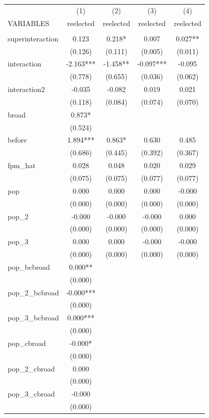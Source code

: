 \documentclass[]{article}
\begin{document}
\begin{tabular}{lcccc} \hline
 & (1) & (2) & (3) & (4) \\
VARIABLES & reelected & reelected & reelected & reelected \\ \hline
 &  &  &  &  \\
superinteraction & 0.123 & 0.218* & 0.007 & 0.027** \\
 & (0.126) & (0.111) & (0.005) & (0.011) \\
interaction & -2.163*** & -1.458** & -0.097*** & -0.095 \\
 & (0.778) & (0.655) & (0.036) & (0.062) \\
interaction2 & -0.035 & -0.082 & 0.019 & 0.021 \\
 & (0.118) & (0.084) & (0.074) & (0.070) \\
broad & 0.873* &  &  &  \\
 & (0.524) &  &  &  \\
before & 1.894*** & 0.863* & 0.630 & 0.485 \\
 & (0.686) & (0.445) & (0.392) & (0.367) \\
fpm\_hat & 0.028 & 0.048 & 0.020 & 0.029 \\
 & (0.075) & (0.075) & (0.077) & (0.077) \\
pop & 0.000 & 0.000 & 0.000 & -0.000 \\
 & (0.000) & (0.000) & (0.000) & (0.000) \\
pop\_2 & -0.000 & -0.000 & -0.000 & 0.000 \\
 & (0.000) & (0.000) & (0.000) & (0.000) \\
pop\_3 & 0.000 & 0.000 & -0.000 & -0.000 \\
 & (0.000) & (0.000) & (0.000) & (0.000) \\
pop\_bcbroad & 0.000** &  &  &  \\
 & (0.000) &  &  &  \\
pop\_2\_bcbroad & -0.000*** &  &  &  \\
 & (0.000) &  &  &  \\
pop\_3\_bcbroad & 0.000*** &  &  &  \\
 & (0.000) &  &  &  \\
pop\_cbroad & -0.000* &  &  &  \\
 & (0.000) &  &  &  \\
pop\_2\_cbroad & 0.000 &  &  &  \\
 & (0.000) &  &  &  \\
pop\_3\_cbroad & -0.000 &  &  &  \\
 & (0.000) &  &  &  \\

\end{tabular}
\end{document}
